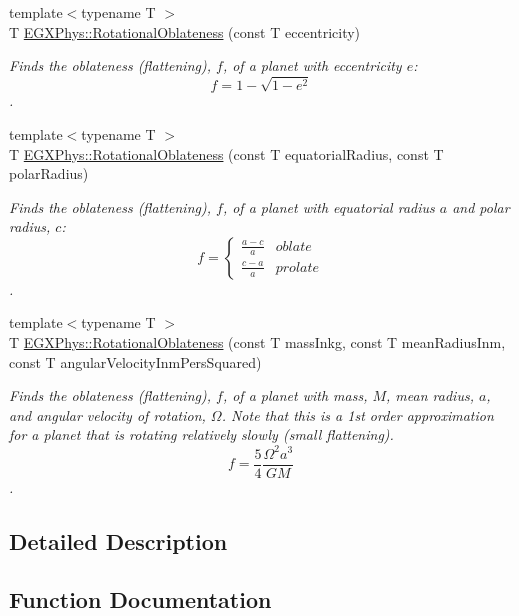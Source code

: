\begin{DoxyCompactItemize}
{\footnotesize template$<$typename T $>$ }\\T \mbox{\hyperlink{group___e_g_x_phys-_astrophysics-_rotational_flattening_ga494ad3b296185bf65ccf3e2ddebc189a}{E\+G\+X\+Phys\+::\+Rotational\+Oblateness}} (const T eccentricity)
\begin{DoxyCompactList}\small\item\em Finds the oblateness (flattening), $f$, of a planet with eccentricity $e$\+: \[ f = 1 - \sqrt{1-e^2} \]. \end{DoxyCompactList}\item 
{\footnotesize template$<$typename T $>$ }\\T \mbox{\hyperlink{group___e_g_x_phys-_astrophysics-_rotational_flattening_ga0bbe606845430e58be5ed34541835f83}{E\+G\+X\+Phys\+::\+Rotational\+Oblateness}} (const T equatorial\+Radius, const T polar\+Radius)
\begin{DoxyCompactList}\small\item\em Finds the oblateness (flattening), $f$, of a planet with equatorial radius $a$ and polar radius, $c$\+: \[ f =\begin{cases} \frac{a-c}{a}{} & oblate \\ \frac{c-a}{a} & prolate \end{cases} \]. \end{DoxyCompactList}\item 
{\footnotesize template$<$typename T $>$ }\\T \mbox{\hyperlink{group___e_g_x_phys-_astrophysics-_rotational_flattening_ga7d78d01c8b3e1a9b2e4f17cb67969a88}{E\+G\+X\+Phys\+::\+Rotational\+Oblateness}} (const T mass\+Inkg, const T mean\+Radius\+Inm, const T angular\+Velocity\+Inm\+Pers\+Squared)
\begin{DoxyCompactList}\small\item\em Finds the oblateness (flattening), $f$, of a planet with mass, $M$, mean radius, $a$, and angular velocity of rotation, $\Omega$. Note that this is a 1st order approximation for a planet that is rotating relatively slowly (small flattening). \[ f = \frac{5}{4} \frac{\Omega^2 a^3}{GM} \]. \end{DoxyCompactList}\end{DoxyCompactItemize}


\subsection{Detailed Description}


\subsection{Function Documentation}
\mbox{\label{group___e_g_x_phys-_astrophysics-_rotational_flattening_gabba90db442c4ec9e12523adb00d66c44}} 
